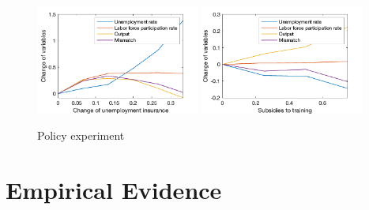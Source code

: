 \documentclass[12pt]{article}
\newcommand{\1}{\mathbb{1}}
\begin{document}
\begin{figure}[h!]
\centering
\caption{Policy experiment}
\label{Simulation}
\includegraphics[width=0.48\textwidth]{Simulation1}
\includegraphics[width=0.48\textwidth]{Simulation2}
\end{figure}

\section{Empirical Evidence}
\end{document}
